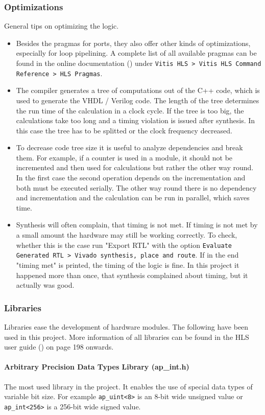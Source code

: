 \subsubsection{Optimizations}
General tips on optimizing the logic.
\begin{itemize}
  \item Besides the pragmas for ports, they also offer other kinds of optimizations, especially for loop pipelining. A complete list of all available pragmas can be found in the online documentation (\cite{xilinx:online_docs}) under \texttt{Vitis HLS > Vitis HLS Command Reference > HLS Pragmas}.
  \item The compiler generates a tree of computations out of the C++ code, which is used to generate the VHDL / Verilog code. The length of the tree determines the run time of the calculation in a clock cycle. If the tree is too big, the calculations take too long and a timing violation is issued after synthesis. In this case the tree has to be splitted or the clock frequency decreased.
  \item To decrease code tree size it is useful to analyze dependencies and break them. For example, if a counter is used in a module, it should not be incremented and then used for calculations but rather the other way round. In the first case the second operation depends on the incrementation and both must be executed serially. The other way round there is no dependency and incrementation and the calculation can be run in parallel, which saves time.
  \item Synthesis will often complain, that timing is not met. If timing is not met by a small amount the hardware may still be working correctly. To check, whether this is the case run "Export RTL" with the option \texttt{Evaluate Generated RTL > Vivado synthesis, place and route}. If in the end "timing met" is printed, the timing of the logic is fine. In this project it happened more than once, that synthesis complained about timing, but it actually was good.
\end{itemize}

\subsubsection{Libraries}
Libraries ease the development of hardware modules. The following have been used in this project. More information of all libraries can be found in the HLS user guide (\cite{xilinx:hls_bible}) on page 198 onwards.

\paragraph{Arbitrary Precision Data Types Library (ap\_int.h)}
The most used library in the project. It enables the use of special data types of variable bit size. For example \texttt{ap\_uint<8>} is an 8-bit wide unsigned value or \texttt{ap\_int<256>} is a 256-bit wide signed value.

